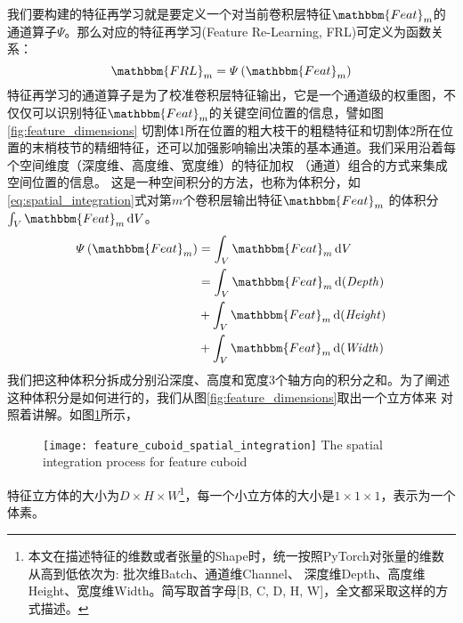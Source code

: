 我们要构建的特征再学习就是要定义一个对当前卷积层特征$\mathbbm{Feat}_m$的通道算子$\varPsi$。那么对应的特征再学习(Feature Re-Learning, FRL)可定义为函数关系：
\begin{equation}
    \mathbbm{FRL}_m = \varPsi\left(\mathbbm{Feat}_m\right)
\end{equation}
特征再学习的通道算子是为了校准卷积层特征输出，它是一个通道级的权重图，不仅仅可以识别特征$\mathbbm{Feat}_m$的关键空间位置的信息，譬如图\ref{fig:feature_dimensions}
切割体1所在位置的粗大枝干的粗糙特征和切割体2所在位置的末梢枝节的精细特征，还可以加强影响输出决策的基本通道。我们采用沿着每个空间维度（深度维、高度维、宽度维）的特征加权
（通道）组合的方式来集成空间位置的信息。 这是一种空间积分的方法，也称为体积分，如\ref{eq:spatial_integration}式对第$m$个卷积层输出特征$\mathbbm{Feat}_m$
的体积分$\int_{V}\mathbbm{Feat}_m\dd V$。
\begin{equation}\label{eq:spatial_integration}
\begin{split}
    \varPsi\left(\mathbbm{Feat}_m\right) &= \int_{V}\mathbbm{Feat}_m\dd V \\
                                         &= \int_{V}\mathbbm{Feat}_m\dd (\mathit{Depth}) \\
                                         &+ \int_{V}\mathbbm{Feat}_m\dd (\mathit{Height}) \\
                                         &+ \int_{V}\mathbbm{Feat}_m\dd (\mathit{Width})
\end{split}
\end{equation}
我们把这种体积分拆成分别沿深度、高度和宽度3个轴方向的积分之和。为了阐述这种体积分是如何进行的，我们从图\ref{fig:feature_dimensions}取出一个立方体来
对照着讲解。如图\ref{fig:spatial_integration}所示，
\begin{figure}[!htp]
    \centering
    \texttt{[image: feature\_cuboid\_spatial\_integration]}
        {The spatial integration process for feature cuboid}
    \label{fig:spatial_integration}
\end{figure}
特征立方体的大小为$D \times H \times W$\footnote{本文在描述特征的维数或者张量的Shape时，统一按照PyTorch对张量的维数从高到低依次为: 批次维Batch、通道维Channel、
深度维Depth、高度维Height、宽度维Width。简写取首字母[B, C, D, H, W]，全文都采取这样的方式描述。}，每一个小立方体的大小是$1 \times 1 \times 1$，表示为一个体素。

